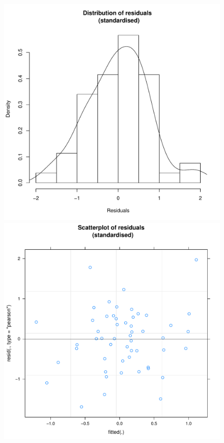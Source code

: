 \begin{figure}[htbp]
    \includegraphics[scale =.4]{images/TEM22Hist.pdf}
    \includegraphics[scale =.4]{images/TEM22Scatter.pdf}

\end{figure}
